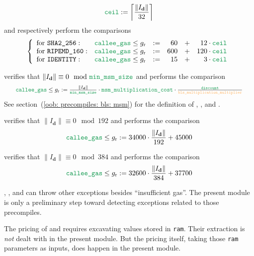 \begin{description}
		\[
			\loc{ceil} := \left \lceil \frac{\| I_\textbf{d} \|}{32} \right \rceil
		\]
		and respectively perform the comparisons
		\[
			\left\{ \begin{array}{llcrcr}
				\text{for }\instShaTwo{}   : & \locCalleeGas \leq g_\text{r} & := & 60  & + & 12  \cdot \locCeil  \\
				\text{for }\instRipemd{}   : & \locCalleeGas \leq g_\text{r} & := & 600 & + & 120 \cdot \locCeil  \\
				\text{for }\instIdentity{} : & \locCalleeGas \leq g_\text{r} & := & 15  & + & 3   \cdot \locCeil  \\
			\end{array} \right.
		\]
	\item[\underline{\instBlsGOneMsm{} and \instBlsGTwoMsm{}:}]
		verifies that $\| I_\textbf{d} \| \equiv 0 \mod \locMinMsmSize$ and performs the comparison 
			\[ \resizebox{.95\linewidth}{!}{$\locCalleeGas \leq g_\text{r} := \frac{\| I_\textbf{d} \|}{\locMinMsmSize} \cdot \locMsmMultiplicationCost \cdot \frac{\locDiscount}{\prcBlsMultiplicationMultiplier}$} \]
			See section~(\ref{oob: precompiles: bls: msm}) for the definition of \locMinMsmSize{}, \locMsmMultiplicationCost{}, \prcBlsMultiplicationMultiplier{} and \locDiscount{}.
	\item[\underline{\instEcpairing{}:}]
		verifies that $\| I_\textbf{d} \| \equiv 0 \mod 192$ and performs the comparison 
		\[ \locCalleeGas \leq g_\text{r} := 34000 \cdot \frac{\| I_\textbf{d} \|}{192} + 45000 \]
	\item[\underline{\instBlsPairingCheck{}:}]
		verifies that $\| I_\textbf{d} \| \equiv 0 \mod 384$ and performs the comparison 
		\[ \locCalleeGas \leq g_\text{r} := 32600 \cdot \frac{\| I_\textbf{d} \|}{384} + 37700 \]
\end{description}

\saNote{}
\instEcrecover, \instEcadd{}, \instEcmul{} and \instEcpairing{} can throw other exceptions besides ``insufficient gas''.
The present module is only a preliminary step toward detecting exceptions related to those precompiles.

\saNote{}
The pricing of \instModexp{} and \instBlake{} requires excavating values stored in \texttt{ram}.
Their extraction is \emph{not} dealt with in the present module.
But the pricing itself, taking those \texttt{ram} parameters as \godGiven{} inputs,
does happen in the present \oobMod{} module.
